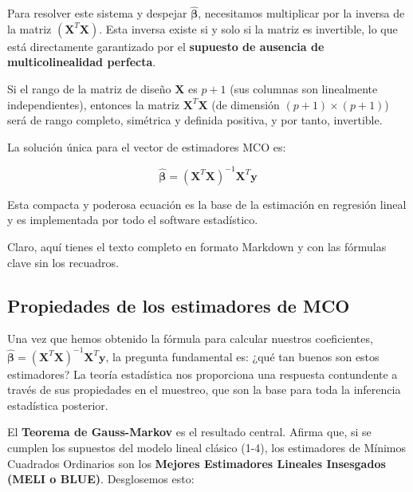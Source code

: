 \documentclass[
  letterpaper,
  DIV=11,
  numbers=noendperiod]{scrreprt}
\begin{document}
Para resolver este sistema y despejar \(\hat{\boldsymbol{\beta}}\),
necesitamos multiplicar por la inversa de la matriz
\((\mathbf{X}^T\mathbf{X})\). Esta inversa existe si y solo si la matriz
es invertible, lo que está directamente garantizado por el
\textbf{supuesto de ausencia de multicolinealidad perfecta}.

Si el rango de la matriz de diseño \(\mathbf{X}\) es \(p+1\) (sus
columnas son linealmente independientes), entonces la matriz
\(\mathbf{X}^T\mathbf{X}\) (de dimensión \((p+1) \times (p+1)\)) será de
rango completo, simétrica y definida positiva, y por tanto, invertible.

La solución única para el vector de estimadores MCO es:

\[\hat{\boldsymbol{\beta}} = (\mathbf{X}^T\mathbf{X})^{-1}\mathbf{X}^T\mathbf{y}\]

Esta compacta y poderosa ecuación es la base de la estimación en
regresión lineal y es implementada por todo el software estadístico.

Claro, aquí tienes el texto completo en formato Markdown y con las
fórmulas clave sin los recuadros.

\subsection{Propiedades de los estimadores de
MCO}\label{propiedades-de-los-estimadores-de-mco-1}

Una vez que hemos obtenido la fórmula para calcular nuestros
coeficientes,
\(\hat{\boldsymbol{\beta}} = (\mathbf{X}^T\mathbf{X})^{-1}\mathbf{X}^T\mathbf{y}\),
la pregunta fundamental es: ¿qué tan buenos son estos estimadores? La
teoría estadística nos proporciona una respuesta contundente a través de
sus propiedades en el muestreo, que son la base para toda la inferencia
estadística posterior.

El \textbf{Teorema de Gauss-Markov} es el resultado central. Afirma que,
si se cumplen los supuestos del modelo lineal clásico (1-4), los
estimadores de Mínimos Cuadrados Ordinarios son los \textbf{Mejores
Estimadores Lineales Insesgados (MELI o BLUE)}. Desglosemos esto:
\end{document}
